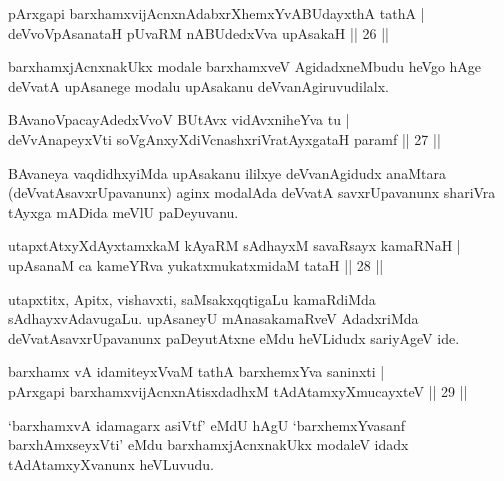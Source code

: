 
\begin{shl}
pArxgapi barxhamxvijAcnxnAdabxrXhemxYvABUdayxthA tathA |\\
deVvoVpAsanataH pUvaRM nABUdedxVva upAsakaH \hfill || 26 || 
\end{shl}

\begin{artha}
barxhamxjAcnxnakUkx modale barxhamxveV AgidadxneMbudu heVgo hAge deVvatA upAsanege modalu upAsakanu deVvanAgiruvudilalx. 
\end{artha}


\begin{shl}
BAvanoVpacayAdedxVvoV BUtAvx vidAvxniheYva tu |\\
deVvAnapeyxVti soV\s gAnxyXdiVcnashxriVratAyxgataH paramf \hfill || 27 || 
\end{shl}

\begin{artha}
BAvaneya vaqdidhxyiMda upAsakanu ililxye deVvanAgidudx anaMtara (deVvatAsavxrUpavanunx) aginx modalAda deVvatA savxrUpavanunx shariVra tAyxga mADida meVlU paDeyuvanu.
\end{artha}

\begin{shl}
utapxtAtxyXdAyxtamxkaM kAyaRM sAdhayxM savaRsayx kamaRNaH |\\
upAsanaM ca kameYRva yukatxmukatxmidaM tataH \hfill || 28 || 
\end{shl}

\begin{artha}
utapxtitx, Apitx, vishavxti, saMsakxqqtigaLu kamaRdiMda sAdhayxvAdavugaLu. upAsaneyU mAnasakamaRveV AdadxriMda deVvatAsavxrUpavanunx paDeyutAtxne eMdu heVLidudx sariyAgeV ide.
\end{artha}

\begin{shl}
barxhamx vA idamiteyxVvaM tathA barxhemxYva saninxti |\\
pArxgapi barxhamxvijAcnxnAtisxdadhxM tAdAtamxyXmucayxteV \hfill || 29 || 
\end{shl}

\begin{artha}
`barxhamxvA idamagarx asiVtf' eMdU hAgU `barxhemxYvasanf barxhAmxseyxVti' eMdu barxhamxjAcnxnakUkx modaleV idadx tAdAtamxyXvanunx heVLuvudu.
\end{artha}

